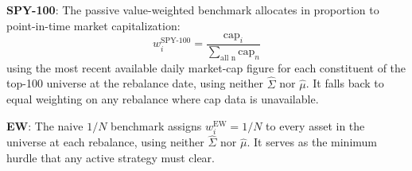 \documentclass[12pt]{article}
\begin{document}
\noindent \textbf{SPY-100}: The passive value-weighted benchmark allocates in proportion to point-in-time market capitalization:
\begin{equation}
  w_i^{\text{SPY-100}} = \frac{\text{cap}_i}{\sum_{\text{all n}} \text{cap}_n}
  \label{eq:app-spy}
\end{equation}
using the most recent available daily market-cap figure for each constituent of the top-100 universe at the rebalance date, using neither $\hat{\Sigma}$ nor $\hat{\mu}$. It falls back to equal weighting on any rebalance where cap data is unavailable.

\noindent \textbf{EW}: The naive $1/N$ benchmark assigns $w^\mathrm{EW}_i = 1/N$ to every asset in the universe at each rebalance, using neither $\hat{\Sigma}$ nor $\hat{\mu}$. It serves as the minimum hurdle that any active strategy must clear.
\end{document}
